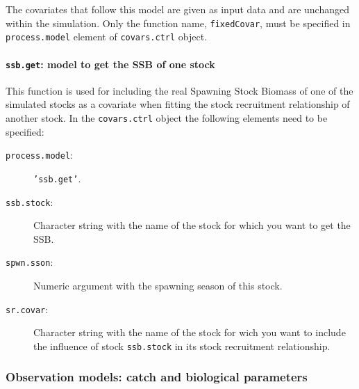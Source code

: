 The covariates that follow this model are given as input data and are unchanged within the simulation.
Only the function name, \texttt{fixedCovar}, must be specified in \texttt{process.model} element of \texttt{covars.ctrl}
object.


\paragraph{\texttt{ssb.get}: model to get the SSB of one stock} \hspace{0pt} \smallskip

This function is used for including the real Spawning Stock Biomass of one of the simulated stocks as a covariate when fitting the stock recruitment relationship of another stock.
In the \texttt{covars.ctrl} object the following elements need to be specified:
\begin{description}
	\item[\texttt{process.model}:] \texttt{'ssb.get'}.
	\item[\texttt{ssb.stock}:] Character string with the name of the stock for which you want to get the SSB.
	\item[\texttt{spwn.sson}:] Numeric argument with the spawning season of this stock. 
	\item[\texttt{sr.covar}:] Character string with the name of the stock for wich you want to include the influence 
	                          of stock \texttt{ssb.stock} in its stock recruitment relationship.
\end{description}


\subsubsection{Observation models: catch and biological parameters}

